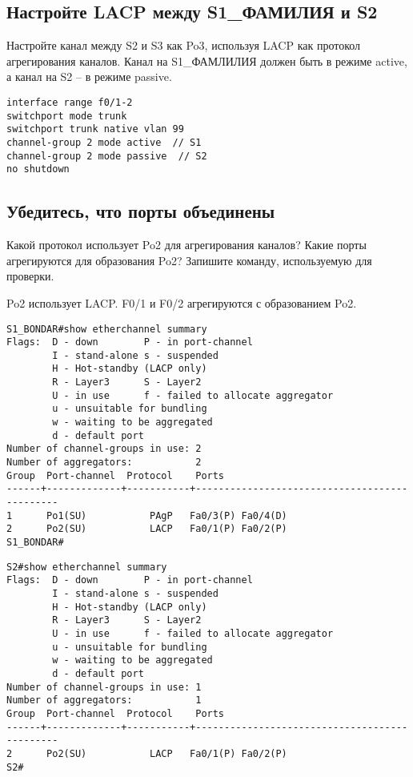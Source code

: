 \subsection{Настройте LACP между S1\_ФАМИЛИЯ и S2}

Настройте канал между S2 и S3 как Po3,
используя LACP как протокол агрегирования каналов.
Канал на S1\_ФАМЛИЛИЯ должен быть в режиме active,
а канал на S2 – в режиме passive.

\begin{verbatim}
interface range f0/1-2
switchport mode trunk
switchport trunk native vlan 99
channel-group 2 mode active  // S1
channel-group 2 mode passive  // S2
no shutdown
\end{verbatim}

\subsection{Убедитесь, что порты объединены}

Какой протокол использует Po2 для агрегирования каналов?
Какие порты агрегируются для образования Po2?
Запишите команду, используемую для проверки.

Po2 использует LACP. F0/1 и F0/2 агрегируются с образованием Po2.

\begin{verbatim}
S1_BONDAR#show etherchannel summary
Flags:  D - down        P - in port-channel
        I - stand-alone s - suspended
        H - Hot-standby (LACP only)
        R - Layer3      S - Layer2
        U - in use      f - failed to allocate aggregator
        u - unsuitable for bundling
        w - waiting to be aggregated
        d - default port
Number of channel-groups in use: 2
Number of aggregators:           2
Group  Port-channel  Protocol    Ports
------+-------------+-----------+----------------------------------------------
1      Po1(SU)           PAgP   Fa0/3(P) Fa0/4(D) 
2      Po2(SU)           LACP   Fa0/1(P) Fa0/2(P) 
S1_BONDAR#
\end{verbatim}

\begin{verbatim}
S2#show etherchannel summary
Flags:  D - down        P - in port-channel
        I - stand-alone s - suspended
        H - Hot-standby (LACP only)
        R - Layer3      S - Layer2
        U - in use      f - failed to allocate aggregator
        u - unsuitable for bundling
        w - waiting to be aggregated
        d - default port
Number of channel-groups in use: 1
Number of aggregators:           1
Group  Port-channel  Protocol    Ports
------+-------------+-----------+----------------------------------------------
2      Po2(SU)           LACP   Fa0/1(P) Fa0/2(P) 
S2#
\end{verbatim}

